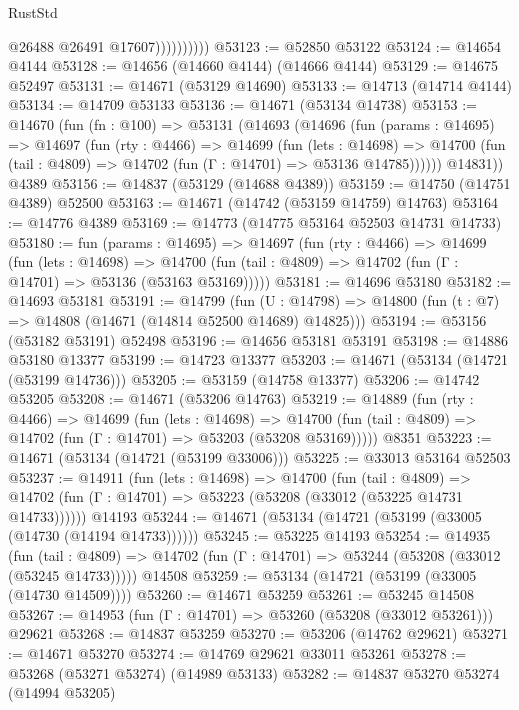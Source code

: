 \begin{lexlean}{RustStd}
\begin{coremodule}
                        @26488
                        @26491
                        @17607))))))))))
@53123 := @52850 @53122
@53124 := @14654 @4144
@53128 := @14656 (@14660 @4144) (@14666 @4144)
@53129 := @14675 @52497
@53131 := @14671 (@53129 @14690)
@53133 := @14713 (@14714 @4144)
@53134 := @14709 @53133
@53136 := @14671 (@53134 @14738)
@53153 := @14670
    (fun (fn : @100) =>
    @53131
      (@14693
        (@14696
          (fun (params : @14695) =>
          @14697
            (fun (rty : @4466) =>
            @14699
              (fun (lets : @14698) =>
              @14700 (fun (tail : @4809) => @14702 (fun (Γ : @14701) => @53136 @14785))))))
        @14831))
    @4389
@53156 := @14837 (@53129 (@14688 @4389))
@53159 := @14750 (@14751 @4389) @52500
@53163 := @14671 (@14742 (@53159 @14759) @14763)
@53164 := @14776 @4389
@53169 := @14773 (@14775 @53164 @52503 @14731 @14733)
@53180 := fun (params : @14695) =>
  @14697
    (fun (rty : @4466) =>
    @14699
      (fun (lets : @14698) =>
      @14700 (fun (tail : @4809) => @14702 (fun (Γ : @14701) => @53136 (@53163 @53169)))))
@53181 := @14696 @53180
@53182 := @14693 @53181
@53191 := @14799
    (fun (U : @14798) => @14800 (fun (t : @7) => @14808 (@14671 (@14814 @52500 @14689) @14825)))
@53194 := @53156 (@53182 @53191) @52498
@53196 := @14656 @53181 @53191
@53198 := @14886 @53180 @13377
@53199 := @14723 @13377
@53203 := @14671 (@53134 (@14721 (@53199 @14736)))
@53205 := @53159 (@14758 @13377)
@53206 := @14742 @53205
@53208 := @14671 (@53206 @14763)
@53219 := @14889
    (fun (rty : @4466) =>
    @14699
      (fun (lets : @14698) =>
      @14700 (fun (tail : @4809) => @14702 (fun (Γ : @14701) => @53203 (@53208 @53169)))))
    @8351
@53223 := @14671 (@53134 (@14721 (@53199 @33006)))
@53225 := @33013 @53164 @52503
@53237 := @14911
    (fun (lets : @14698) =>
    @14700
      (fun (tail : @4809) =>
      @14702 (fun (Γ : @14701) => @53223 (@53208 (@33012 (@53225 @14731 @14733))))))
    @14193
@53244 := @14671 (@53134 (@14721 (@53199 (@33005 (@14730 (@14194 @14733))))))
@53245 := @53225 @14193
@53254 := @14935
    (fun (tail : @4809) => @14702 (fun (Γ : @14701) => @53244 (@53208 (@33012 (@53245 @14733)))))
    @14508
@53259 := @53134 (@14721 (@53199 (@33005 (@14730 @14509))))
@53260 := @14671 @53259
@53261 := @53245 @14508
@53267 := @14953 (fun (Γ : @14701) => @53260 (@53208 (@33012 @53261))) @29621
@53268 := @14837 @53259
@53270 := @53206 (@14762 @29621)
@53271 := @14671 @53270
@53274 := @14769 @29621 @33011 @53261
@53278 := @53268 (@53271 @53274) (@14989 @53133)
@53282 := @14837 @53270 @53274 (@14994 @53205)

\end{coremodule}
\end{lexlean}
